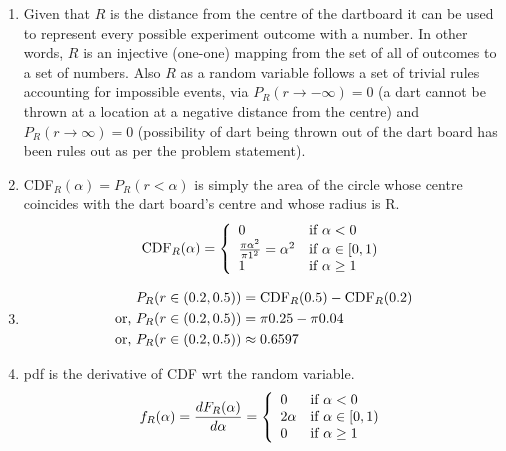 \begin{enumerate}[7a.]
	\item Given that $R$ is the distance from the centre of the dartboard it can be used to represent every possible experiment outcome with a number. In other words, $R$ is an injective (one-one) mapping from the set of all of outcomes to a set of numbers. Also $R$ as a random variable follows a set of trivial rules accounting for impossible events, via $P_R(r\rightarrow-\infty) = 0$ (a dart cannot be thrown at a location at a negative distance from the centre) and $P_R(r\rightarrow\infty) = 0$ (possibility of dart being thrown out of the dart board has been rules out as per the problem statement).
	
	\item CDF$_R(\alpha) = P_R(r<\alpha)$ is simply the area of the circle whose centre coincides with the dart board's centre and whose radius is R.\\[5pt]
	\begin{equation}
		\text{CDF}_R(\alpha) = \threepartdef{0}{\alpha < 0}{\frac{\pi \alpha^2}{\pi 1^2} = \alpha^2}{\alpha \in [0,1)}{1}{\alpha \geq 1} \nonumber
	\end{equation}
	
	\item 
		\begin{align}
			P_R(r \in (0.2, 0.5)) &= \text{CDF}_R(0.5) - \text{CDF}_R(0.2) \nonumber\\
			\text{or, } P_R(r \in (0.2, 0.5)) &= \pi0.25 - \pi0.04 \nonumber\\
			\text{or, } P_R(r \in (0.2, 0.5)) &\approx  0.6597 \nonumber
		\end{align}
	
	\item pdf is the derivative of CDF wrt the random variable.\\
	\begin{equation}
		f_R(\alpha) = \frac{dF_R(\alpha)}{d\alpha} = \threepartdef{0}{\alpha < 0}{2\alpha}{\alpha \in [0,1)}{0}{\alpha \geq 1} \nonumber
	\end{equation}
	

\end{enumerate}
